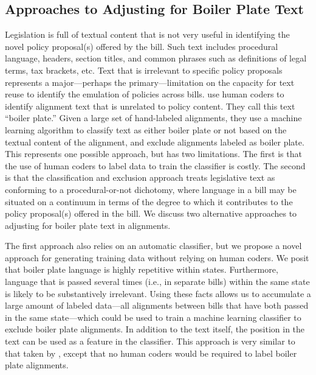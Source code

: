 \documentclass[12pt]{article} %
\begin{document}
\subsection{Approaches to Adjusting for Boiler Plate Text}

Legislation is full of textual content that is not very useful in identifying the novel policy proposal(s) offered by the bill. Such text includes procedural language, headers, section titles, and common phrases such as definitions of legal terms, tax brackets, etc. Text that is irrelevant to specific policy proposals represents a major---perhaps the primary---limitation on the capacity for text reuse to identify the emulation of policies across bills. \citet{wilkerson2015tracing} use human coders to identify alignment text that is unrelated to policy content. They call this text ``boiler plate.'' Given a large set of hand-labeled alignments, they use a machine learning algorithm to classify text as either boiler plate or not based on the textual content of the alignment, and exclude alignments labeled as boiler plate. This represents one possible approach, but has two limitations. The first is that the use of human coders to label data to train the classifier is costly. The second is that the classification and exclusion approach treats legislative text as conforming to a procedural-or-not dichotomy, where language in a bill may be situated on a continuum in terms of the degree to which it contributes to the policy proposal(s) offered in the bill. We discuss two alternative approaches to adjusting for boiler plate text in alignments.

The first approach also relies on an automatic classifier, but we propose a novel approach for
generating training data without relying on human coders. We posit that boiler plate language is highly repetitive within states. Furthermore, language
that is passed several times (i.e., in separate bills) within the same state is likely to be
substantively irrelevant. Using these facts allows us to accumulate a large
amount of labeled data---all alignments between bills that have both passed in
the same state---which could be used to train a machine learning classifier to exclude boiler plate alignments. In addition to the text
itself, the position in the text can be used as a feature in the classifier.
This approach is very similar to that taken by \citet{wilkerson2015tracing},
except that no human coders would be required to label boiler plate alignments.
\end{document}
